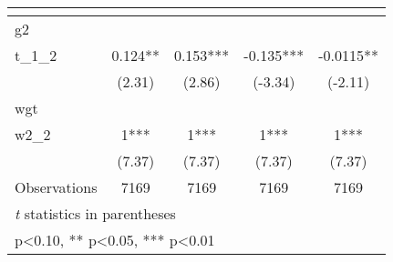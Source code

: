 \begin{table}[htbp]\centering
\def\sym#1{\ifmmode^{#1}\else\(^{#1}\)\fi}
\caption{ \label{tab1}}
\begin{tabular}{l*{4}{c}}
\toprule
                    &\multicolumn{1}{c}{}&\multicolumn{1}{c}{}&\multicolumn{1}{c}{}&\multicolumn{1}{c}{}\\
\midrule
g2                  &               &               &               &               \\
t\_1\_2               &       0.124** &       0.153***&      -0.135***&     -0.0115** \\
                    &      (2.31)   &      (2.86)   &     (-3.34)   &     (-2.11)   \\
\midrule
wgt                 &               &               &               &               \\
w2\_2                &           1***&           1***&           1***&           1***\\
                    &      (7.37)   &      (7.37)   &      (7.37)   &      (7.37)   \\
\midrule
Observations        &        7169   &        7169   &        7169   &        7169   \\
\bottomrule
\multicolumn{5}{l}{\footnotesize \textit{t} statistics in parentheses}\\
\multicolumn{5}{l}{\footnotesize * p<0.10, ** p<0.05, *** p<0.01}\\
\end{tabular}
\end{table}
